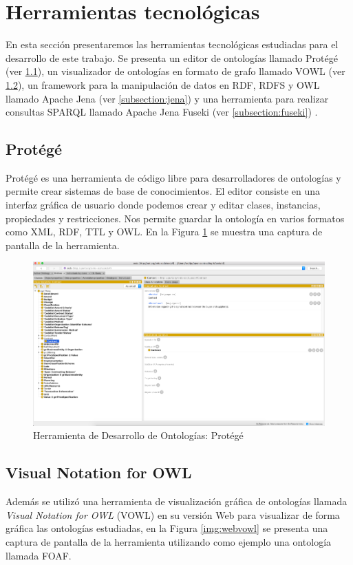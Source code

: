 \section{Herramientas tecnológicas}
En esta sección presentaremos las herramientas tecnológicas estudiadas para el desarrollo de este trabajo. Se presenta un editor de ontologías llamado Protégé (ver \ref{subsection:protege}), un visualizador de ontologías en formato de grafo llamado VOWL (ver \ref{subsection:vowl}), un framework para la manipulación de datos en RDF, RDFS y OWL llamado Apache Jena (ver \ref{subsection:jena}) y una herramienta para realizar consultas SPARQL llamado Apache Jena Fuseki (ver \ref{subsection:fuseki}) .
\subsection{Protégé}
\label{subsection:protege}
Protégé es una herramienta de código libre para desarrolladores de ontologías y permite crear sistemas de base de conocimientos. El editor consiste en una interfaz gráfica de usuario donde podemos crear y editar clases, instancias, propiedades y restricciones. Nos permite guardar la ontología en varios formatos como XML, RDF, TTL y OWL. En la Figura \ref{img:protege} se muestra una captura de pantalla de la herramienta.

\begin{figure}[h!]
    \centering
    \includegraphics[width=150mm]{figuras/protege}
    \caption{Herramienta de Desarrollo de Ontologías: Protégé}
    \label{img:protege}
    \end{figure}

\subsection{Visual Notation for OWL}
\label{subsection:vowl}
Además se utilizó una herramienta de visualización gráfica de ontologías llamada \textit{Visual Notation for OWL} (VOWL) en su versión Web para visualizar de forma gráfica las ontologías estudiadas, en la Figura \ref{img:webvowl} se presenta una captura de pantalla de la herramienta utilizando como ejemplo una ontología llamada FOAF.

